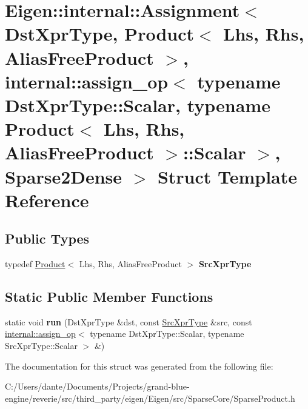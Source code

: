 \hypertarget{struct_eigen_1_1internal_1_1_assignment_3_01_dst_xpr_type_00_01_product_3_01_lhs_00_01_rhs_00_01c841c32521f12d3d43fe6d566cc4cbd8}{}\section{Eigen\+::internal\+::Assignment$<$ Dst\+Xpr\+Type, Product$<$ Lhs, Rhs, Alias\+Free\+Product $>$, internal\+::assign\+\_\+op$<$ typename Dst\+Xpr\+Type\+::Scalar, typename Product$<$ Lhs, Rhs, Alias\+Free\+Product $>$\+::Scalar $>$, Sparse2\+Dense $>$ Struct Template Reference}
\label{struct_eigen_1_1internal_1_1_assignment_3_01_dst_xpr_type_00_01_product_3_01_lhs_00_01_rhs_00_01c841c32521f12d3d43fe6d566cc4cbd8}
\subsection*{Public Types}
\begin{DoxyCompactItemize}
\item 
\mbox{\label{struct_eigen_1_1internal_1_1_assignment_3_01_dst_xpr_type_00_01_product_3_01_lhs_00_01_rhs_00_01c841c32521f12d3d43fe6d566cc4cbd8_abddf37655aa7ad93f556b77e97a36ab2}} 
typedef \mbox{\hyperlink{class_eigen_1_1_product}{Product}}$<$ Lhs, Rhs, Alias\+Free\+Product $>$ {\bfseries Src\+Xpr\+Type}
\end{DoxyCompactItemize}
\subsection*{Static Public Member Functions}
\begin{DoxyCompactItemize}
\item 
\mbox{\label{struct_eigen_1_1internal_1_1_assignment_3_01_dst_xpr_type_00_01_product_3_01_lhs_00_01_rhs_00_01c841c32521f12d3d43fe6d566cc4cbd8_a969d643c0bc0547dda3f2a9d1dbc4285}} 
static void {\bfseries run} (Dst\+Xpr\+Type \&dst, const \mbox{\hyperlink{class_eigen_1_1_product}{Src\+Xpr\+Type}} \&src, const \mbox{\hyperlink{struct_eigen_1_1internal_1_1assign__op}{internal\+::assign\+\_\+op}}$<$ typename Dst\+Xpr\+Type\+::\+Scalar, typename Src\+Xpr\+Type\+::\+Scalar $>$ \&)
\end{DoxyCompactItemize}


The documentation for this struct was generated from the following file\+:\begin{DoxyCompactItemize}
\item 
C\+:/\+Users/dante/\+Documents/\+Projects/grand-\/blue-\/engine/reverie/src/third\+\_\+party/eigen/\+Eigen/src/\+Sparse\+Core/Sparse\+Product.\+h\end{DoxyCompactItemize}
